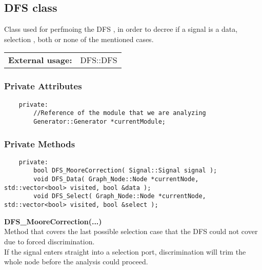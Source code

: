 \documentclass{article}
\begin{document}
\subsection{DFS class}

Class used for perfmoing the DFS , in order to decree if a signal is a data, selection , both or none of the mentioned cases.\\

\begin{tabular}{ll}
	\textbf{External usage: } & DFS::DFS\\
\end{tabular}

\subsubsection{Private Attributes}

\begin{mdframed}[hidealllines=true, backgroundcolor=magenta!10]
	\begin{lstlisting}
	private:
		//Reference of the module that we are analyzing
		Generator::Generator *currentModule;
	\end{lstlisting}
\end{mdframed}

\subsubsection{Private Methods}

\begin{mdframed}[hidealllines=true, backgroundcolor=magenta!10]
	\begin{lstlisting}
	private:
		bool DFS_MooreCorrection( Signal::Signal signal );
		void DFS_Data( Graph_Node::Node *currentNode, std::vector<bool> visited, bool &data );
		void DFS_Select( Graph_Node::Node *currentNode, std::vector<bool> visited, bool &select );
	\end{lstlisting}
\end{mdframed}

\textbf{DFS\_MooreCorrection(...)}\\
Method that covers the last possible selection case that the DFS could not cover due to forced discrimination.\\
If the signal enters straight into a selection port, discrimination will trim the whole node before the analysis could proceed.\\\\
\end{document}
